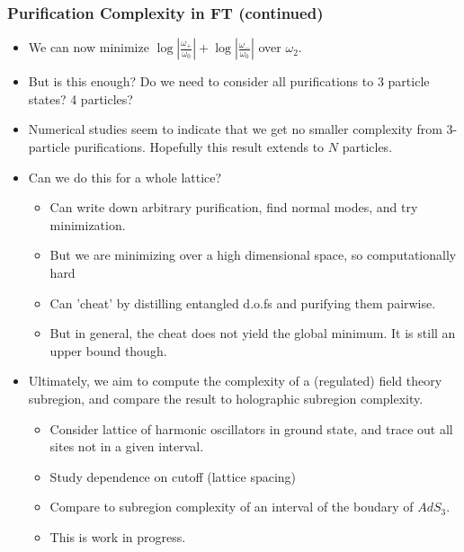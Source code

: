 \documentclass[10pt,aspectratio=169]{beamer}
\begin{document}
\begin{frame}
\frametitle{Purification Complexity in FT (continued)}

\begin{itemize}

\item We can now minimize $\log \left|\frac{\omega_+}{\omega_0} \right| + \log \left| \frac{\omega_-}{\omega_0} \right|$ over $\omega_2$.

\item But is this enough? Do we need to consider all purifications to 3 particle states? 4 particles?

\item Numerical studies seem to indicate that we get no smaller complexity from 3-particle purifications. Hopefully this result extends to $N$ particles.

\item Can we do this for a whole lattice? 

\begin{itemize}

	\item Can write down arbitrary purification, find normal modes, and try minimization.
	
	\item But we are minimizing over a high dimensional space, so computationally hard
	
	\item Can 'cheat' by distilling entangled d.o.fs and purifying them pairwise.
	
	\item But in general, the cheat does not yield the global minimum. It is still an upper bound though.

\end{itemize} 

\item Ultimately, we aim to compute the complexity of a (regulated) field theory subregion, and compare the result to holographic subregion complexity.

\begin{itemize}
	
	\item Consider lattice of harmonic oscillators in ground state, and trace out all sites not in a given interval.
	
	\item Study dependence on cutoff (lattice spacing)
	
	\item Compare to subregion complexity of an interval of the boudary of $AdS_3$.	
	
	\item This is work in progress.
	
\end{itemize}

\end{itemize} 

\end{frame}
\end{document}
